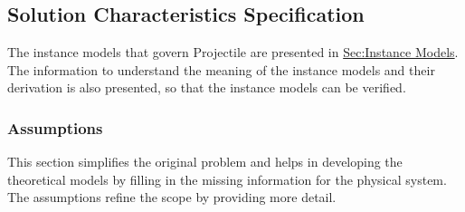 \documentclass[12pt]{article}
\begin{document}
\subsection{Solution Characteristics Specification}
\label{Sec:SolCharSpec}
The instance models that govern Projectile are presented in \hyperref[Sec:IMs]{Sec:Instance Models}. The information to understand the meaning of the instance models and their derivation is also presented, so that the instance models can be verified.

\subsubsection{Assumptions}
\label{Sec:Assumps}
This section simplifies the original problem and helps in developing the theoretical models by filling in the missing information for the physical system. The assumptions refine the scope by providing more detail.
\end{document}
